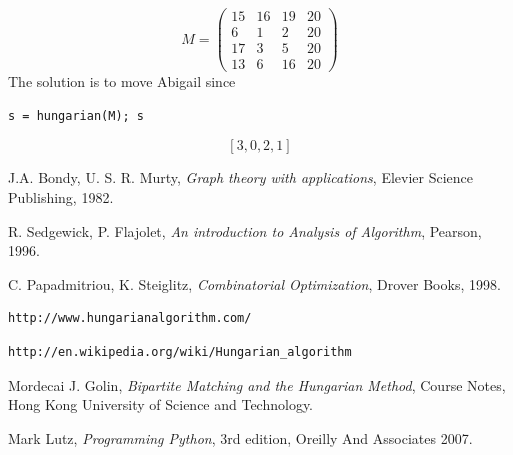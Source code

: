\documentclass[12pt]{ClasseMatematicamente}
\begin{document}
\begin{equation}
M = 
\left(\begin{array}{rrrr}
15 & 16 & 19 & 20 \\
6 & 1 & 2 & 20 \\
17 & 3 & 5 & 20 \\
13 & 6 & 16 & 20
\end{array}\right)
\end{equation}
The solution is to move Abigail since
\begin{small}
 \begin{lstlisting}
s = hungarian(M); s
\end{lstlisting}
\end{small}
$$
\left[3, 0, 2, 1\right]
$$
%

\vspace{0.1cm}

%


\begin{thebibliography}{5}

J.A. Bondy, U. S. R. Murty, \emph{Graph theory with applications}, Elevier Science Publishing, 1982.

R. Sedgewick, P. Flajolet, \emph{An introduction to Analysis of Algorithm}, Pearson, 1996.

C. Papadmitriou, K. Steiglitz, \emph{Combinatorial Optimization}, Drover Books, 1998.

\begin{small}
\begin{verbatim}
http://www.hungarianalgorithm.com/
\end{verbatim}
\end{small}

\begin{small}
\begin{verbatim}
http://en.wikipedia.org/wiki/Hungarian_algorithm
\end{verbatim}
\end{small}

Mordecai J. Golin, \emph{Bipartite Matching and the Hungarian Method}, Course Notes, Hong Kong University of Science and Technology.

Mark Lutz, \emph{Programming Python}, 3rd edition, Oreilly And Associates 2007.

\end{thebibliography}
\end{document}
